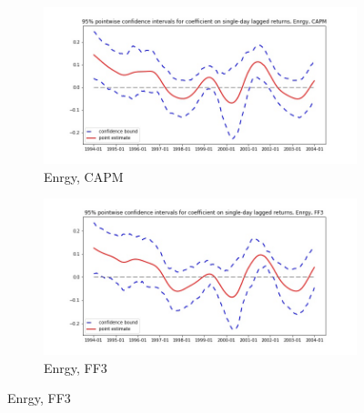\documentclass{article}
\begin{document}
 \begin{figure}
  \begin{subfigure}[b]{0.5\textwidth}
    \centering
    \includegraphics[width=\textwidth]{Enrgy/pointwiseCIs_CAPM.jpg}
    \caption{Enrgy, CAPM}
    \label{fig:1}
  \end{subfigure}
  \begin{subfigure}[b]{0.5\textwidth}
    \centering
    \includegraphics[width=\textwidth]{Enrgy/pointwiseCIs_FF3.jpg}
    \caption{Enrgy, FF3}
    \label{fig:2}
  \end{subfigure}
  \end{figure}
  
  \newpage
  
\end{document}
